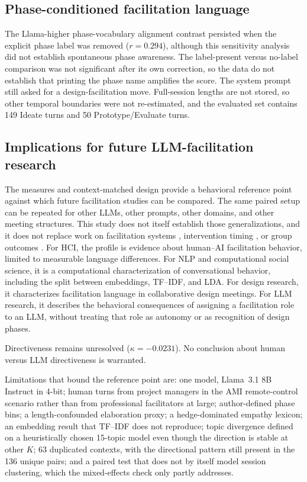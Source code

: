 \documentclass[10pt,journal,compsoc]{IEEEtran}
\begin{document}
\subsection{Phase-conditioned facilitation language}
The Llama-higher phase-vocabulary alignment contrast persisted when the explicit phase label was removed ($r = 0.294$), although this sensitivity analysis did not establish spontaneous phase awareness. The label-present versus no-label comparison was not significant after its own correction, so the data do not establish that printing the phase name amplifies the score. The system prompt still asked for a design-facilitation move. Full-session lengths are not stored, so other temporal boundaries were not re-estimated, and the evaluated set contains 149 Ideate turns and 50 Prototype/Evaluate turns.

\subsection{Implications for future LLM-facilitation research}
The measures and context-matched design provide a behavioral reference point against which future facilitation studies can be compared. The same paired setup can be repeated for other LLMs, other prompts, other domains, and other meeting structures. This study does not itself establish those generalizations, and it does not replace work on facilitation systems \cite{dong2024facilitation}, intervention timing \cite{tsirmpas2026facilitate}, or group outcomes \cite{alsobay2026table}. For HCI, the profile is evidence about human--AI facilitation behavior, limited to measurable language differences. For NLP and computational social science, it is a computational characterization of conversational behavior, including the split between embeddings, TF--IDF, and LDA. For design research, it characterizes facilitation language in collaborative design meetings. For LLM research, it describes the behavioral consequences of assigning a facilitation role to an LLM, without treating that role as autonomy or as recognition of design phases.

Directiveness remains unresolved ($\kappa = -0.0231$). No conclusion about human versus LLM directiveness is warranted.

Limitations that bound the reference point are: one model, Llama~3.1 8B Instruct in 4-bit; human turns from project managers in the AMI remote-control scenario rather than from professional facilitators at large; author-defined phase bins; a length-confounded elaboration proxy; a hedge-dominated empathy lexicon; an embedding result that TF--IDF does not reproduce; topic divergence defined on a heuristically chosen 15-topic model even though the direction is stable at other $K$; 63 duplicated contexts, with the directional pattern still present in the 136 unique pairs; and a paired test that does not by itself model session clustering, which the mixed-effects check only partly addresses.
\end{document}
